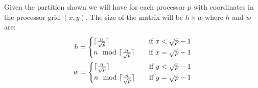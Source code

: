 \documentclass[a4paper]{article}
\begin{document}
    Given the partition shown we will have for each processor $p$ with coordinates in the processor grid $(x,y)$. The size of the matrix will be $h \times w$ where $h$ and $w$ are:
    \begin{align}
    h = \begin{cases}
    \ceil{\frac{n}{\sqrt{p}}} \quad & \text{if  } x < \sqrt{p}-1\\
    n \mod \ceil{\frac{n}{\sqrt{p}}} \quad & \text{if  } x = \sqrt{p}-1\\
    \end{cases}\\
    w = \begin{cases}
    \ceil{\frac{n}{\sqrt{p}}} \quad & \text{if  } y < \sqrt{p}-1\\
    n \mod \ceil{\frac{n}{\sqrt{p}}} \quad & \text{if  } y = \sqrt{p}-1\\
    \end{cases}
    \end{align}
\end{document}
